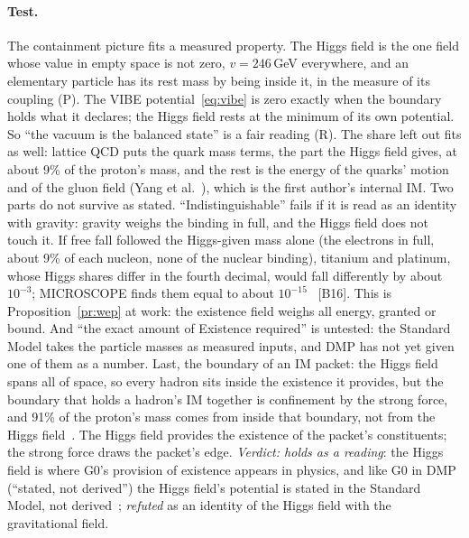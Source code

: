 \documentclass[11pt,a4paper]{article}
\theoremstyle{definition}
\newcommand{\chk}[1]{\textsf{[#1]}}
\newcommand{\tagR}{\textsf{(R)}}
\newcommand{\tagP}{\textsf{(P)}}
\begin{document}
\paragraph{Test.} The containment picture fits a measured property. The Higgs field is the one field whose value in empty space is not
zero, $v=246$\,GeV everywhere, and an elementary particle has its rest mass by being inside it, in the measure of its coupling \tagP. The
VIBE potential~\eqref{eq:vibe} is zero exactly when the boundary holds what it declares; the Higgs field rests at the minimum of its own
potential. So ``the vacuum is the balanced state'' is a fair reading \tagR. The share left out fits as well: lattice QCD puts the quark mass
terms, the part the Higgs field gives, at about 9\% of the proton's mass, and the rest is the energy of the quarks' motion and of the gluon
field (Yang et al.~\cite{yang}), which is the first author's internal IM. Two parts do not survive as stated. ``Indistinguishable'' fails if
it is read as an identity with gravity: gravity weighs the binding in full, and the Higgs field does not touch it. If free fall followed
the Higgs-given mass alone (the electrons in full, about 9\% of each nucleon, none of the nuclear binding), titanium and platinum, whose
Higgs shares differ in the fourth decimal, would fall differently by about $10^{-3}$; MICROSCOPE finds them equal to about
$10^{-15}$~\cite{microscope} \chk{B16}. This is Proposition~\ref{pr:wep} at work: the existence field weighs all energy, granted or bound.
And ``the exact amount of Existence required'' is untested: the Standard Model takes the particle masses as measured inputs, and DMP has
not yet given one of them as a number. Last, the boundary of an IM packet: the Higgs field spans all of space, so every hadron sits
inside the existence it provides, but the boundary that holds a hadron's IM together is confinement by the strong force, and 91\% of the
proton's mass comes from inside that boundary, not from the Higgs field~\cite{yang}. The Higgs field provides the existence of the
packet's constituents; the strong force draws the packet's edge. \emph{Verdict: holds as a reading}: the Higgs field is where G0's
provision of existence appears in physics, and like G0 in DMP (``stated, not derived'') the Higgs field's potential is stated in the
Standard Model, not derived~\cite{higgs64,be64}; \emph{refuted} as an identity of the Higgs field with the gravitational field.
\end{document}
